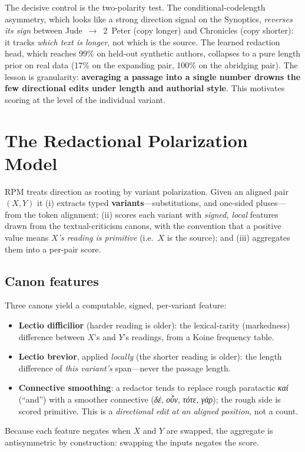 \documentclass[11pt,letterpaper]{article}
\newcommand{\gk}[1]{{\greekfont\itshape #1}}
\begin{document}
The decisive control is the two-polarity test. The conditional-codelength asymmetry, which looks
like a strong direction signal on the Synoptics, \textit{reverses its sign} between
Jude~$\rightarrow$~2~Peter (copy longer) and Chronicles (copy shorter): it tracks \textit{which
text is longer}, not which is the source. The learned redaction head, which reaches 99\% on
held-out synthetic authors, collapses to a pure length prior on real data (17\% on the expanding
pair, 100\% on the abridging pair). The lesson is granularity: \textbf{averaging a passage into a
single number drowns the few directional edits under length and authorial style}. This motivates
scoring at the level of the individual variant.

\section{The Redactional Polarization Model}
\label{sec:rpm}

RPM treats direction as rooting by variant polarization. Given an aligned pair $(X,Y)$ it (i)
extracts typed \textbf{variants}---substitutions, and one-sided pluses---from the token
alignment; (ii) scores each variant with \textit{signed, local} features drawn from the
textual-criticism canons, with the convention that a positive value means \textit{$X$'s reading
is primitive} (i.e.\ $X$ is the source); and (iii) aggregates them into a per-pair score.

\subsection{Canon features}

Three canons yield a computable, signed, per-variant feature:
\begin{itemize}
\item \textbf{Lectio difficilior} (harder reading is older): the lexical-rarity (markedness)
  difference between $X$'s and $Y$'s readings, from a Koine frequency table.
\item \textbf{Lectio brevior}, applied \textit{locally} (the shorter reading is older): the
  length difference of \textit{this variant's} span---never the passage length.
\item \textbf{Connective smoothing}: a redactor tends to replace rough paratactic \gk{καί}
  (``and'') with a smoother connective (\gk{δέ}, \gk{οὖν}, \gk{τότε}, \gk{γάρ}); the rough side
  is scored primitive. This is a \textit{directional edit at an aligned position}, not a count.
\end{itemize}
Because each feature negates when $X$ and $Y$ are swapped, the aggregate is antisymmetric by
construction: swapping the inputs negates the score.
\end{document}
